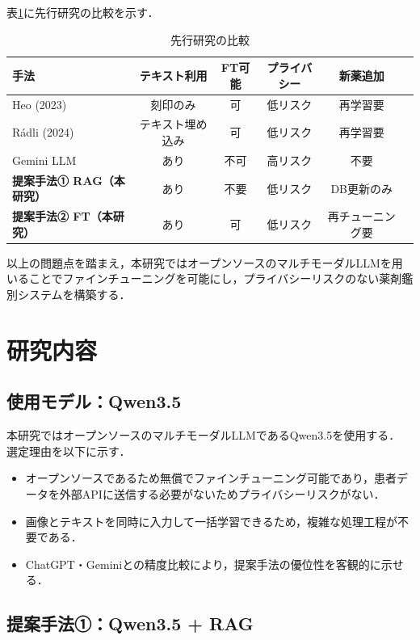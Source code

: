 \documentclass{ltjsarticle}
\begin{document}
表\ref{tab:related}に先行研究の比較を示す．

\begin{table}[h]
\centering
\caption{先行研究の比較}
\label{tab:related}
\begin{tabular}{lccccc}
\toprule
手法 & テキスト利用 & FT可能 & プライバシー & 新薬追加 \\
\midrule
Heo (2023) \cite{heo2023pill}           & 刻印のみ & 可 & 低リスク & 再学習要 \\
Rádli (2024) \cite{radli2024metric}     & テキスト埋め込み & 可 & 低リスク & 再学習要 \\
Gemini LLM \cite{gemini2024pill}        & あり & 不可 & 高リスク & 不要 \\
\textbf{提案手法① RAG（本研究）}        & あり & 不要 & 低リスク & DB更新のみ \\
\textbf{提案手法② FT（本研究）}         & あり & 可 & 低リスク & 再チューニング要 \\
\bottomrule
\end{tabular}
\end{table}

以上の問題点を踏まえ，本研究ではオープンソースのマルチモーダルLLMを用いることでファインチューニングを可能にし，プライバシーリスクのない薬剤鑑別システムを構築する．

\newpage

\section{研究内容}\label{sec3}

\subsection{使用モデル：Qwen3.5}

本研究ではオープンソースのマルチモーダルLLMであるQwen3.5を使用する．
選定理由を以下に示す．

\begin{itemize}
  \item オープンソースであるため無償でファインチューニング可能であり，患者データを外部APIに送信する必要がないためプライバシーリスクがない．
  \item 画像とテキストを同時に入力して一括学習できるため，複雑な処理工程が不要である．
  \item ChatGPT・Geminiとの精度比較により，提案手法の優位性を客観的に示せる．
\end{itemize}

\subsection{提案手法①：Qwen3.5 + RAG}
\end{document}
